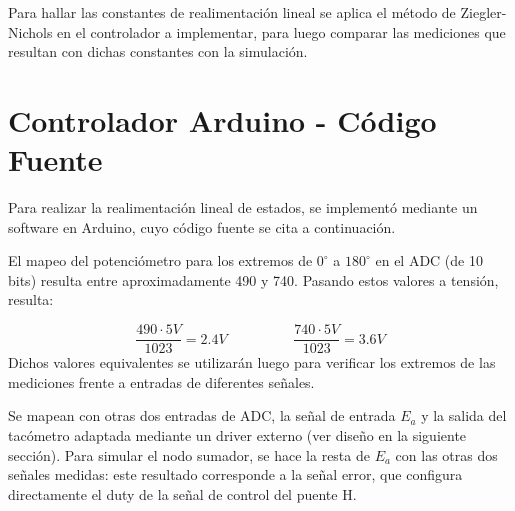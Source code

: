 \documentclass{article}
\begin{document}
Para hallar las constantes de realimentación lineal se aplica el método de Ziegler-Nichols en el controlador a implementar, para luego comparar las mediciones que resultan con dichas constantes con la simulación.

\newpage

\section{Controlador Arduino - Código Fuente}
Para realizar la realimentación lineal de estados, se implementó mediante un software en Arduino, cuyo código fuente se cita a continuación.\par
El mapeo del potenciómetro para los extremos de $0^{\circ}$ a $180^{\circ}$ en el ADC (de 10 bits) resulta entre aproximadamente 490 y 740. Pasando estos valores a tensión, resulta:

\[
\frac{490 \cdot 5V}{1023} = 2.4V \hspace{2cm} \frac{740 \cdot 5V}{1023} = 3.6V
\]
Dichos valores equivalentes se utilizarán luego para verificar los extremos de las mediciones frente a entradas de diferentes señales.\par
Se mapean con otras dos entradas de ADC, la señal de entrada $E_a$ y la salida del tacómetro adaptada mediante un driver externo (ver diseño en la siguiente sección). Para simular el nodo sumador, se hace la resta de $E_a$ con las otras dos señales medidas: este resultado corresponde a la señal error, que configura directamente el duty de la señal de control del puente H.
\end{document}
